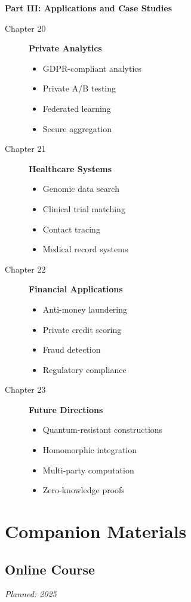 \textbf{Part III: Applications and Case Studies}
\begin{description}
\item[Chapter 20] \textbf{Private Analytics}
    \begin{itemize}
    \item GDPR-compliant analytics
    \item Private A/B testing
    \item Federated learning
    \item Secure aggregation
    \end{itemize}

\item[Chapter 21] \textbf{Healthcare Systems}
    \begin{itemize}
    \item Genomic data search
    \item Clinical trial matching
    \item Contact tracing
    \item Medical record systems
    \end{itemize}

\item[Chapter 22] \textbf{Financial Applications}
    \begin{itemize}
    \item Anti-money laundering
    \item Private credit scoring
    \item Fraud detection
    \item Regulatory compliance
    \end{itemize}

\item[Chapter 23] \textbf{Future Directions}
    \begin{itemize}
    \item Quantum-resistant constructions
    \item Homomorphic integration
    \item Multi-party computation
    \item Zero-knowledge proofs
    \end{itemize}
\end{description}

\section{Companion Materials}

\subsection{Online Course}
\textit{Planned: 2025}

